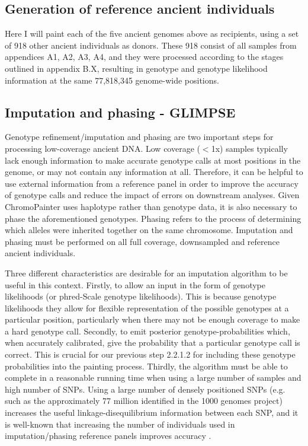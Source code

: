 \subsection{Generation of reference ancient individuals}

Here I will paint each of the five ancient genomes above as recipients, using a set of 918 other ancient individuals as donors. These 918 consist of all samples from appendices A1, A2, A3, A4, and they were processed according to the stages outlined in appendix B.X, resulting in genotype and genotype likelihood information at the same 77,818,345 genome-wide positions.


\subsection{Imputation and phasing - GLIMPSE}

Genotype refinement/imputation and phasing are two important steps for processing low-coverage ancient DNA. Low coverage ($<$1x) samples typically lack enough information to make accurate genotype calls at most positions in the genome, or may not contain any information at all. Therefore, it can be helpful to use external information from a reference panel in order to improve the accuracy of genotype calls and reduce the impact of errors on downstream analyses. Given ChromoPainter uses haplotype rather than genotype data, it is also necessary to phase the aforementioned genotypes. Phasing refers to the process of determining which alleles were inherited together on the same chromosome. Imputation and phasing must be performed on all full coverage, downsampled and reference ancient individuals. 

Three different characteristics are desirable for an imputation algorithm to be useful in this context. Firstly, to allow an input in the form of genotype likelihoods (or phred-Scale genotype likelihoods). This is because genotype likelihoods they allow for flexible representation of the possible genotypes at a particular position, particularly when there may not be enough coverage to make a hard genotype call. Secondly, to emit posterior genotype-probabilities which, when accurately calibrated, give the probability that a particular genotype call is correct. This is crucial for our previous step 2.2.1.2 for including these genotype probabilities into the painting process. Thirdly, the algorithm must be able to complete in a reasonable running time when using a large number of samples and high number of SNPs. Using a large number of densely positioned SNPs (e.g. such as the approximately 77 million identified in the 1000 genomes project) increases the useful linkage-disequilibrium information between each SNP, and it is well-known that increasing the number of individuals used in imputation/phasing reference panels improves accuracy \cite{delaneau2018integrative, HUANG2009235, mccarthy2016reference, rubinacci2021efficient}. 

